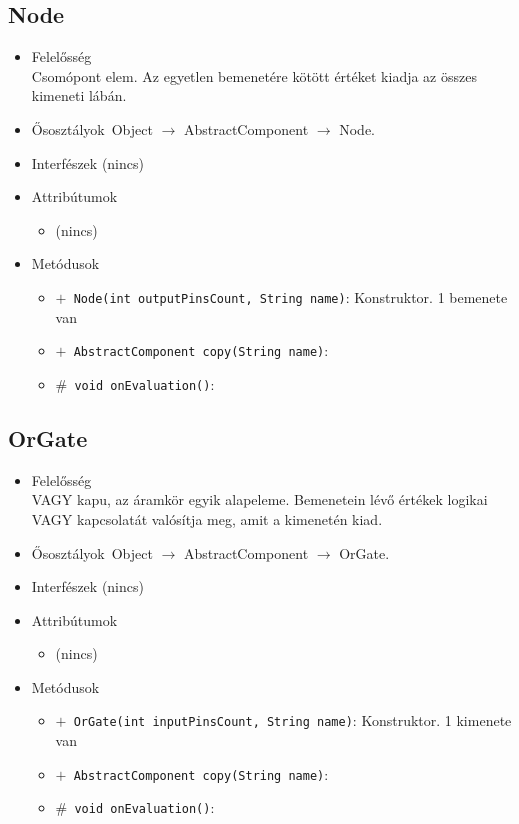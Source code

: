 \subsection{Node}
\begin{itemize}
\item Felelősség\\
Csomópont elem. Az egyetlen bemenetére kötött értéket kiadja az összes kimeneti lábán.
\item Ősosztályok\ Object $\rightarrow{}$ AbstractComponent $\rightarrow{}$ Node.
\item Interfészek (nincs)
\item Attribútumok $\ $
\begin{itemize}
\item (nincs)
\end{itemize}
\item Metódusok$\ $
\begin{itemize}
	\item[] \texttt{$+$ Node(int outputPinsCount, String name)}: Konstruktor. 1 bemenete van
	\item[] \texttt{$+$ AbstractComponent copy(String name)}: 
	\item[] \texttt{$\#$ void onEvaluation()}: 
\end{itemize}
\end{itemize}

\subsection{OrGate}
\begin{itemize}
\item Felelősség\\
VAGY kapu, az áramkör egyik alapeleme. Bemenetein lévő értékek logikai VAGY kapcsolatát  valósítja meg, amit a kimenetén kiad.
\item Ősosztályok\ Object $\rightarrow{}$ AbstractComponent $\rightarrow{}$ OrGate.
\item Interfészek (nincs)
\item Attribútumok $\ $
\begin{itemize}
\item (nincs)
\end{itemize}
\item Metódusok$\ $
\begin{itemize}
	\item[] \texttt{$+$ OrGate(int inputPinsCount, String name)}: Konstruktor. 1 kimenete van
	\item[] \texttt{$+$ AbstractComponent copy(String name)}: 
	\item[] \texttt{$\#$ void onEvaluation()}: 
\end{itemize}
\end{itemize}

